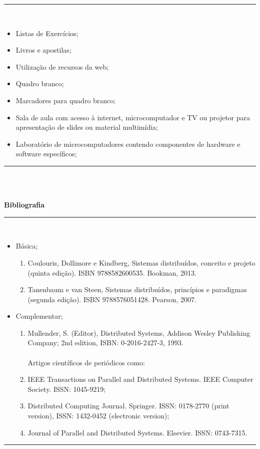 \vspace{-5mm}
\noindent\rule{16.5cm}{0.4pt}
\\
\begin{itemize} 
  \item Listas de Exercícios;
  \item Livros e apostilas;
  \item Utilização de recursos da web;
  \item Quadro branco;
  \item Marcadores para quadro branco;
  \item Sala de aula com acesso à internet, microcomputador e TV ou projetor para apresentação de slides ou material multimídia;
  \item Laboratório de microcomputadores contendo componentes de hardware e software específicos;
\end{itemize}
\noindent\rule{16.5cm}{0.4pt}\\
\\
\vspace{-12mm}
\begin{center}\textbf{Bibliografia}\end{center}
\vspace{-5mm}
\noindent\rule{16.5cm}{0.4pt}
\\
\begin{itemize} 
  \item Básica;
	\begin{enumerate}
	\item Coulouris, Dollimore e Kindberg, Sistemas distribuídos, conceito e projeto (quinta edição). ISBN 9788582600535. Bookman, 2013.
	\item Tanenbaum e van Steen, Sistemas distribuídos, princípios e paradigmas (segunda edição). ISBN 9788576051428. Pearson, 2007.
	\end{enumerate}
  \item Complementar;
	\begin{enumerate} 
	\item Mullender, S. (Editor), Distributed Systems, Addison Wesley Publishing Company; 2nd edition, ISBN: 0-2016-2427-3, 1993.\\
        \\
	Artigos cient\'ificos de peri\'odicos como: 
	\item IEEE Transactions on Parallel and Distributed Systems. IEEE Computer Society. ISSN: 1045-9219;
	\item Distributed Computing Journal. Springer. ISSN: 0178-2770 (print version), ISSN: 1432-0452 (electronic version);
	\item Journal of Parallel and Distributed Systems. Elsevier. ISSN: 0743-7315.
	\end{enumerate}
\end{itemize}
\noindent\rule{16.5cm}{0.4pt}\\
\\
